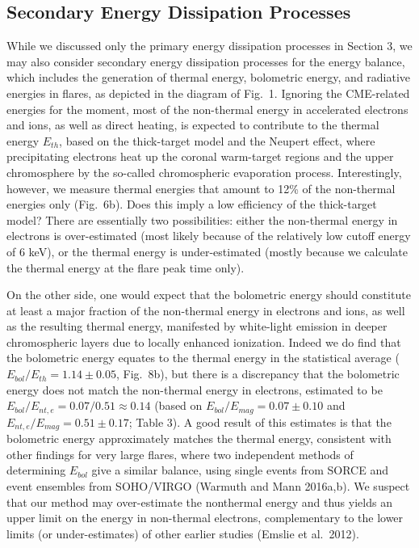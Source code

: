 \documentclass[10pt,preprint]{aastex}  %
\begin{document}
\subsection{	Secondary Energy Dissipation Processes	}

While we discussed only the primary energy dissipation processes
in Section 3, we may also consider secondary energy dissipation
processes for the energy balance, 
which includes the generation of thermal energy,
bolometric energy, and radiative energies in flares, as depicted
in the diagram of Fig.~1. Ignoring the CME-related energies for
the moment, most of the non-thermal energy in accelerated
electrons and ions, as well as direct heating, is expected
to contribute to the thermal energy $E_{th}$, based on the
thick-target model and the Neupert effect, where precipitating
electrons heat up the coronal warm-target regions and the upper
chromosphere by the so-called chromospheric evaporation process.
Interestingly, however, we measure thermal energies that amount
to 12\% of the non-thermal energies only (Fig.~6b). Does this
imply a low efficiency of the thick-target model? There are
essentially two possibilities: either the non-thermal energy 
in electrons is over-estimated (most likely because of the 
relatively low cutoff energy of 6 keV), or the thermal energy is
under-estimated (mostly because we calculate the thermal
energy at the flare peak time only).

On the other side, one would expect that the bolometric energy
should constitute at least a major fraction of the non-thermal
energy in electrons and ions, as well as the resulting thermal
energy, manifested by white-light emission in deeper chromospheric 
layers due to locally enhanced ionization. Indeed we do find 
that the bolometric energy equates to the thermal energy in the
statistical average ($E_{bol}/E_{th}=1.14\pm0.05$, Fig.~8b),
but there is a discrepancy that the bolometric energy does not
match the non-thermal energy in electrons, estimated to be
$E_{bol}/E_{nt,e}=0.07/0.51 \approx 0.14$ (based on  
$E_{bol}/E_{mag}=0.07\pm0.10$ and   
$E_{nt,e}/E_{mag}=0.51\pm0.17$; Table 3). 
A good result of this estimates is that the bolometric energy
approximately matches the thermal energy, consistent with
other findings for very large flares, where two independent 
methods of determining $E_{bol}$ give a similar balance,
using single events from SORCE and event ensembles from SOHO/VIRGO
(Warmuth and Mann 2016a,b). We suspect that our method
may over-estimate the nonthermal energy and thus yields an upper
limit on the energy in non-thermal electrons, complementary 
to the lower limits (or under-estimates) of other earlier
studies (Emslie et al.~2012).
\end{document}
